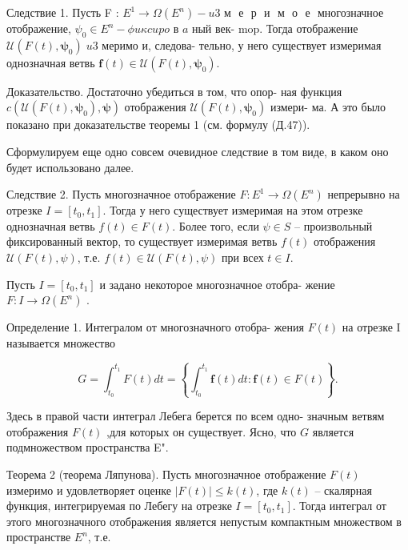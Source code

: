 \documentclass[8pt]{extarticle}
\begin{document}
Следствие 1. Пусть F : \({E}^{1} \rightarrow  \Omega \left( {E}^{n}\right)  - {u3\text{ м }\text{ е }\text{ р }\text{ и }\text{ м }\text{ о }\text{ е }}\) многозначное отображение, \({\psi }_{0} \in  {E}^{n} - {\phi u\kappa cupo\text{ в }a}\) ный век- mop. Тогда отображение \(\mathcal{U}\left( {F\left( t\right) ,{\mathbf{\psi }}_{0}}\right) \;{u3}\) меримо и, следова- тельно, у него существует измеримая однозначная ветвь \(\mathbf{f}\left( t\right)  \in  \mathcal{U}\left( {F\left( t\right) ,{\mathbf{\psi }}_{0}}\right) .\)

Доказательство. Достаточно убедиться в том, что опор- ная функция \(c\left( {\mathcal{U}\left( {F\left( t\right) ,{\mathbf{\psi }}_{0}}\right) ,\mathbf{\psi }}\right)\) отображения \(\mathcal{U}\left( {F\left( t\right) ,{\mathbf{\psi }}_{0}}\right)\) измери- ма. А это было показано при доказательстве теоремы 1 (см. формулу (Д.47)).

Сформулируем еще одно совсем очевидное следствие в том виде, в каком оно будет использовано далее.

Следствие 2. Пусть многозначное отображение \(F : {E}^{1} \rightarrow  \Omega \left( {E}^{n}\right)\) непрерывно на отрезке \(I = \left\lbrack  {{t}_{0},{t}_{1}}\right\rbrack\). Тогда у него существует измеримая на этом отрезке однозначная ветвь \(f\left( t\right)  \in  F\left( t\right)\). Более того, если \(\psi \in S\) -- произвольный фиксированный вектор, то существует измеримая ветвь \(f\left( t\right)\) отображения \(\mathcal{U}\left( {F\left( t\right) ,\psi }\right)\), т.е. \(f\left( t\right)  \in  \mathcal{U}\left( {F\left( t\right) ,\psi }\right)\) при всех \(t \in I\).

Пусть \(I = \left\lbrack  {{t}_{0},{t}_{1}}\right\rbrack\) и задано некоторое многозначное отобра- жение \(F : I \rightarrow  \Omega \left( {E}^{n}\right)\) .

Определение 1. Интегралом от многозначного отобра- жения \(F\left( t\right)\) на отрезке I называется множество

\[
G = {\int }_{{t}_{0}}^{{t}_{1}}F\left( t\right) {dt} = \left\{  {{\int }_{{t}_{0}}^{{t}_{1}}\mathbf{f}\left( t\right) {dt} : \mathbf{f}\left( t\right)  \in  F\left( t\right) }\right\}  .
\]

Здесь в правой части интеграл Лебега берется по всем одно- значным ветвям отображения \(F\left( t\right)\) ,для которых он существует. Ясно, что \(G\) является подмножеством пространства E".

Теорема 2 (теорема Ляпунова). Пусть многозначное отображение \(F\left( t\right)\) измеримо и удовлетворяет оценке \(\left| {F\left( t\right) }\right|  \leq  k\left( t\right)\), где \(k\left( t\right)\) -- скалярная функция, интегрируемая по Лебегу на отрезке \(I = \left\lbrack  {{t}_{0},{t}_{1}}\right\rbrack\). Тогда интеграл от этого многозначного отображения является непустым компактным множеством в пространстве \({E}^{n}\), т.е.
\end{document}
